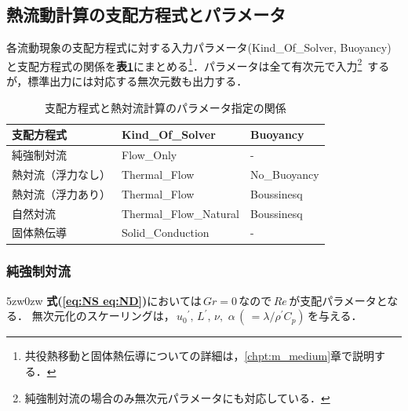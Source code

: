 \subsection{熱流動計算の支配方程式とパラメータ}
各流動現象の支配方程式に対する入力パラメータ(Kind\_Of\_Solver, Buoyancy)と支配方程式の関係を\textbf{表\ref{tbl:thermal mode}}にまとめる\footnote{共役熱移動と固体熱伝導についての詳細は，\ref{chpt:m_medium}章で説明する．}．パラメータは全て有次元で入力\footnote{純強制対流の場合のみ無次元パラメータにも対応している．}\ するが，標準出力には対応する無次元数も出力する．\\

\begin{table}[htdp]
\small
\caption{支配方程式と熱対流計算のパラメータ指定の関係}
\begin{center}
\begin{tabular}{lll} \toprule
支配方程式 & Kind\_Of\_Solver & Buoyancy\\ \midrule
純強制対流 & Flow\_Only & -\\
熱対流（浮力なし）& Thermal\_Flow & No\_Buoyancy\\
熱対流（浮力あり）& Thermal\_Flow & Boussinesq\\
自然対流 & Thermal\_Flow\_Natural & Boussinesq\\
固体熱伝導 & Solid\_Conduction & -\\ \bottomrule
\end{tabular}
\end{center}
\label{tbl:thermal mode}
\end{table}


\subsubsection{純強制対流}
\begin{indentation}{5zw}{0zw}
\noindent \textbf{式(\ref{eq:NS eq:ND})}においては$\,Gr=0\,$なので$\,Re\,$が支配パラメータとなる．
無次元化のスケーリングは，$\,{u_{0}}^{\prime},\,L^{\prime},\,\nu,\,\,\alpha\,(\,=\lambda / \rho^{\prime} C_{p})\,$を与える．\\

\end{indentation}

